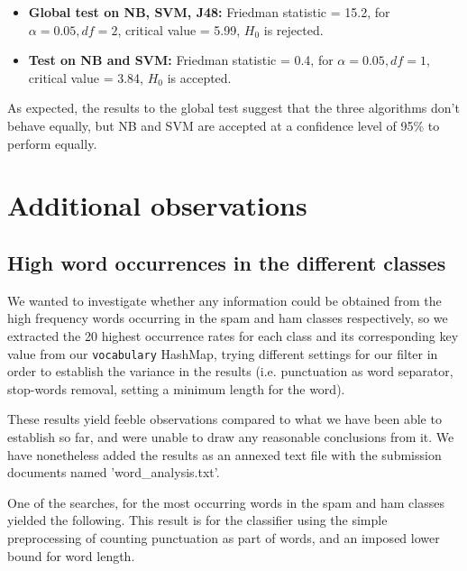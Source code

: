 \documentclass[12pt,a4paper]{report}
\begin{document}
\begin{itemize}
\item \textbf{Global test on NB, SVM, J48:} Friedman statistic = 15.2, for $ \alpha = 0.05, df = 2 $, critical value = 5.99, $ H_0 $ is rejected.
\item \textbf{Test on NB and SVM:} Friedman statistic = 0.4, for $ \alpha = 0.05, df = 1 $, critical value = 3.84, $ H_0 $ is accepted.
\end{itemize}

As expected, the results to the global test suggest that the three algorithms don't behave equally, but NB and SVM are accepted at a confidence level of 95\% to perform equally.

\section{Additional observations}
\subsection{High word occurrences in the different classes}
We wanted to investigate whether any information could be obtained from the high frequency words occurring in the spam and ham classes respectively, so we extracted the 20 highest occurrence rates for each class and its corresponding key value from our \texttt{vocabulary} HashMap, trying different settings for our filter in order to establish the variance in the results (i.e. punctuation as word separator, stop-words removal, setting a minimum length for the word).

These results yield feeble observations compared to what we have been able to establish so far, and were unable to draw any reasonable conclusions from it. We have nonetheless added the results as an annexed text file with the submission documents named 'word\_analysis.txt'. 

One of the searches, for the most occurring words in the spam and ham classes yielded the following. This result is for the classifier using the simple preprocessing of counting punctuation as part of words, and an imposed lower bound for word length. 
\end{document}
